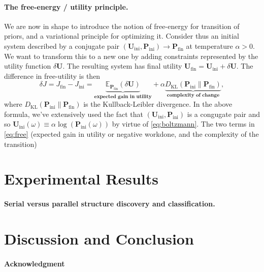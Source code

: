 \documentclass{article} %
\def\U{\mathbf{U}}
\def\P{\mathbf{P}}
\begin{document}
  \paragraph{The free-energy / utility principle.}
  We are now in shape to introduce the notion of free-energy for transition of priors, and a variational principle for optimizing it. Consider thus an initial system described by a conjugate pair $(\U_{\text{ini}}, \P_{\text{ini}}) \rightarrow \P_{\text{fin}}$ at temperature $\alpha > 0$. We want to transform this to a new one by adding constraints represented by the utility function $\delta \U$.  The resulting system has final utility $\U_{\text{fin}} = \U_{\text{ini}} + \delta\U$. The difference in free-utility is then
  \begin{equation}
    \delta J = J_{\text{fin}} - J_{\text{ini}} = \underbrace{\mathbb E_{\P_{\text{fin}}}(\delta \U)}_{\textbf{expected gain in utility}} + \alpha \underbrace{D_{\text{KL}}(\P_{\text{ini}}\|\P_{\text{fin}})}_{\textbf{complexity of change}},
    \label{eq:free}
  \end{equation}
  where $D_{\text{KL}}(\P_{\text{ini}}\|\P_{\text{fin}})$ is the Kullback-Leibler divergence.
  In the above formula, we've extensively used the fact that $(\U_{\text{ini}}, \P_{\text{ini}})$ is a congugate pair and so $\U_{\text{ini}}(\omega) \equiv \alpha \log(\P_{\text{ini}}(\omega))$ by virtue of \eqref{eq:boltzmann}.
  The two terms in \eqref{eq:free} (expected gain in utility or negative workdone, and the complexity of the transition) 
  
\section{Experimental Results}
\paragraph{Serial versus parallel structure discovery and classification.}


\section{Discussion and Conclusion}



\paragraph{Acknowledgment}

\small


\end{document}
